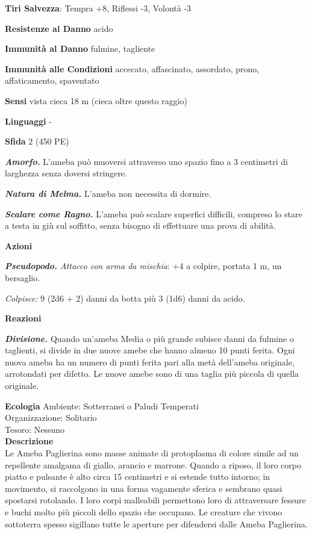 \begin{multicols}{2}
\textbf{Tiri Salvezza}: Tempra +8, Riflessi -3, Volontà -3

\textbf{Resistenze al Danno} acido

\textbf{Immunità al Danno} fulmine, tagliente

\textbf{Immunità alle Condizioni} accecato, affascinato, assordato, prono, affaticamento, spaventato

\textbf{Sensi} vista cieca 18 m (cieca oltre questo raggio)

\textbf{Linguaggi} -

\textbf{Sfida} 2 (450 PE)

\emph{\textbf{Amorfo.}} L'ameba può muoversi attraverso uno spazio fino a 3 centimetri di larghezza senza doversi stringere.

\emph{\textbf{Natura di Melma.}} L'ameba non necessita di dormire.

\emph{\textbf{Scalare come Ragno.}} L'ameba può scalare superfici
difficili, compreso lo stare a testa in giù sul soffitto, senza bisogno
di effettuare una prova di abilità.

\textbf{Azioni}

\emph{\textbf{Pseudopodo.} Attacco con arma da mischia}: +4 a colpire,
portata 1 m, un bersaglio.

\emph{Colpisce:} 9 (2d6 + 2) danni da botta più 3 (1d6) danni da
acido.

\textbf{Reazioni}

\emph{\textbf{Divisione.}} Quando un'ameba Media o più grande subisce danni da fulmine o taglienti, si divide in due nuove amebe che hanno almeno 10 punti ferita. Ogni nuova ameba ha un numero di punti ferita pari alla metà dell'ameba originale, arrotondati per difetto. Le nuove amebe sono di una taglia più piccola di quella originale.

\textbf{Ecologia}
Ambiente: Sotterranei o Paludi Temperati\\
Organizzazione: Solitario\\
Tesoro: Nessuno\\
\textbf{Descrizione}\\
Le Ameba Paglierina sono masse animate di protoplasma di colore simile ad un repellente amalgama di giallo, arancio e marrone. Quando a riposo, il loro corpo piatto e pulsante è alto circa 15 centimetri e si estende tutto intorno; in movimento, si raccolgono in una forma vagamente sferica e sembrano quasi spostarsi rotolando. I loro corpi malleabili permettono loro di attraversare fessure e buchi molto più piccoli dello spazio che occupano. Le creature che vivono sottoterra spesso sigillano tutte le aperture per difendersi dalle Ameba Paglierina.\\


\end{multicols}
